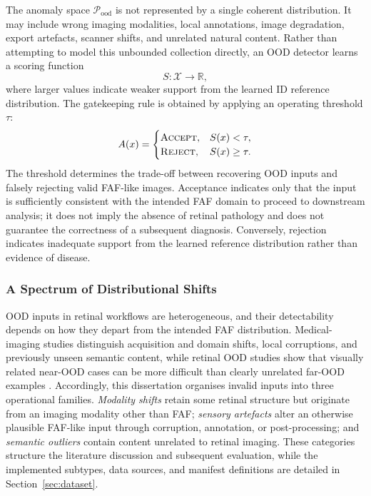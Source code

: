 \documentclass[fleqn,12pt]{olplainarticle}
\begin{document}
The anomaly space $\mathcal{P}_{\mathrm{ood}}$ is not represented by a single coherent distribution. It may include wrong imaging modalities, local annotations, image degradation, export artefacts, scanner shifts, and unrelated natural content. Rather than attempting to model this unbounded collection directly, an OOD detector learns a scoring function
\begin{equation}
    S:\mathcal{X}\rightarrow\mathbb{R},
\end{equation}
where larger values indicate weaker support from the learned ID reference distribution. The gatekeeping rule is obtained by applying an operating threshold $\tau$:
\begin{equation}
    A(x)=
    \begin{cases}
        \textsc{Accept}, & S(x)<\tau,\\
        \textsc{Reject}, & S(x)\geq\tau.
    \end{cases}
    \label{eq:decision_rule}
\end{equation}
The threshold determines the trade-off between recovering OOD inputs and falsely rejecting valid FAF-like images. Acceptance indicates only that the input is sufficiently consistent with the intended FAF domain to proceed to downstream analysis; it does not imply the absence of retinal pathology and does not guarantee the correctness of a subsequent diagnosis. Conversely, rejection indicates inadequate support from the learned reference distribution rather than evidence of disease.

\subsubsection{A Spectrum of Distributional Shifts}

OOD inputs in retinal workflows are heterogeneous, and their detectability depends on how they depart from the intended FAF distribution. Medical-imaging studies distinguish acquisition and domain shifts, local corruptions, and previously unseen semantic content, while retinal OOD studies show that visually related near-OOD cases can be more difficult than clearly unrelated far-OOD examples \cite{hong2024medicalood,araujo2023fewshot,wang2023uios}. Accordingly, this dissertation organises invalid inputs into three operational families. \emph{Modality shifts} retain some retinal structure but originate from an imaging modality other than FAF; \emph{sensory artefacts} alter an otherwise plausible FAF-like input through corruption, annotation, or post-processing; and \emph{semantic outliers} contain content unrelated to retinal imaging. These categories structure the literature discussion and subsequent evaluation, while the implemented subtypes, data sources, and manifest definitions are detailed in Section~\ref{sec:dataset}.
\end{document}
